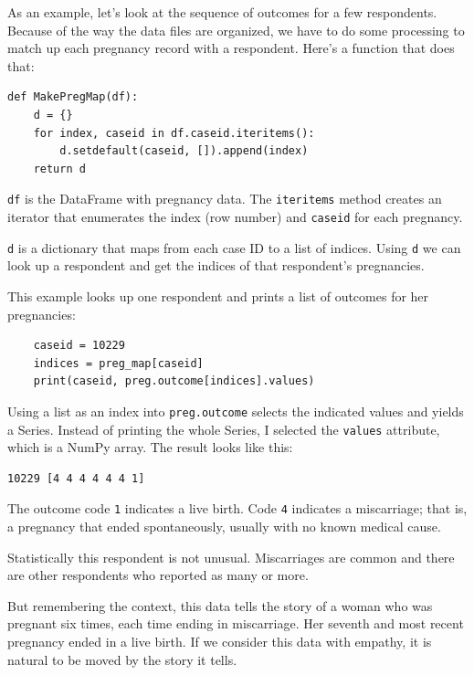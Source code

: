 \documentclass[12pt]{book}
\begin{document}
As an example, let's look at the sequence of outcomes for a few
respondents.  Because of the way the data files are organized, we have
to do some processing to match up each pregnancy record with a respondent.
Here's a function that does that:


\begin{verbatim}
def MakePregMap(df):
    d = {}
    for index, caseid in df.caseid.iteritems():
        d.setdefault(caseid, []).append(index)
    return d
\end{verbatim}

{\tt df} is the DataFrame with pregnancy data.  The {\tt iteritems}
method creates an iterator that enumerates the index (row number)
and {\tt caseid} for each pregnancy.

{\tt d} is a dictionary that maps from each case ID to a list of
indices.  Using {\tt d} we can look up a respondent and get the
indices of that respondent's pregnancies.

This example looks up one respondent and prints a list of outcomes
for her pregnancies:

\begin{verbatim}
    caseid = 10229
    indices = preg_map[caseid]
    print(caseid, preg.outcome[indices].values)
\end{verbatim}

Using a list as an index into {\tt preg.outcome} selects the
indicated values and yields a Series.  Instead of printing the
whole Series, I selected the {\tt values} attribute, which is
a NumPy array.  The result looks like this:

\begin{verbatim}
10229 [4 4 4 4 4 4 1]
\end{verbatim}

The outcome code {\tt 1} indicates a live birth. Code {\tt 4} indicates
a miscarriage; that is, a pregnancy that ended spontaneously, usually
with no known medical cause.

Statistically this respondent is not unusual.  Miscarriages are common
and there are other respondents who reported as many or more.

But remembering the context, this data tells the story of a woman who
was pregnant six times, each time ending in miscarriage.  Her seventh
and most recent pregnancy ended in a live birth.  If we consider this
data with empathy, it is natural to be moved by the story it tells.
\end{document}
